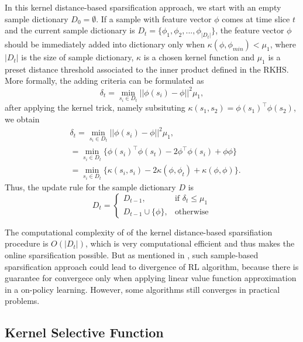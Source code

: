 \documentclass[conference]{IEEEtran}
\begin{document}
In this kernel distance-based sparsification approach, we start with an empty sample dictionary $D_0 = \emptyset$. If a sample with feature vector $\phi$ comes at time slice $t$ and the current sample dictionary is $D_t = \{\phi_1, \phi_2,..., \phi_{|D_t|}\}$, the feature vector $\phi$ should be immediately added into dictionary only when $\kappa(\phi, \phi_{min}) < \mu_1$, where $|D_t|$ is the size of sample dictionary, $\kappa$ is a chosen kernel function and $\mu_1$ is a preset distance threshold associated to the inner product defined in the RKHS. More formally, the adding criteria can be formulated as
\begin{equation}
  \delta_t = \min_{s_i\in D_t}||\phi(s_i)-\phi||^2 \mu_1,
\end{equation}
after applying the kernel trick, namely subsituting $\kappa(s_1, s_2)=\phi(s_1)^\top\phi(s_2)$, we obtain
\begin{equation}
  \begin{split}
    &\delta_t = \min_{s_i\in D_t}||\phi(s_i)-\phi||^2 \mu_1,\\
    &=\min_{s_i\in D_t}\{\phi(s_i)^\top\phi(s_t) - 2\phi^\top\phi(s_i)+\phi\phi\}\\
    &=\min_{s_i\in D_t}\{\kappa(s_i, s_i)-2\kappa(\phi, \phi_t)+\kappa(\phi, \phi)\}.
  \end{split}
\end{equation}
Thus, the update rule for the sample dictionary $D$ is
\begin{equation}
  D_t =
      \begin{cases}
          D_{t-1},& \text{if } \delta_t\leq \mu_1\\
          D_{t-1}\cup \{\phi\}, & \text{otherwise}
      \end{cases}
\end{equation}

The computational complexity of of the kernel distance-based sparsifiation procedure is $O(|D_t|)$, which is very computational efficient and thus makes the online sparsification possible. But as mentioned in \cite{tsitsiklis1997analysis}\cite{sutton2009convergent}, such sample-based sparsification approach could lead to divergence of RL algorithm, because there is guarantee for convergece only when applying linear value function approximation in a on-policy learning. However, some algorithms still converges in practical problems.
\subsection{Kernel Selective Function}
\end{document}
